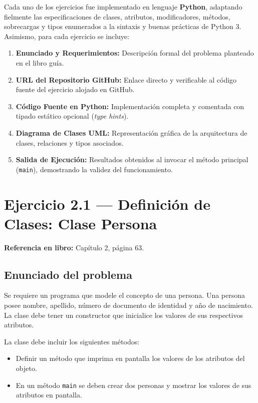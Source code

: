 \documentclass[11pt,a4paper]{article}
\begin{document}
Cada uno de los ejercicios fue implementado en lenguaje \textbf{Python}, adaptando fielmente las especificaciones de clases, atributos, modificadores, métodos, sobrecargas y tipos enumerados a la sintaxis y buenas prácticas de Python 3. Asimismo, para cada ejercicio se incluye:
\begin{enumerate}[leftmargin=*]
    \item \textbf{Enunciado y Requerimientos:} Descripción formal del problema planteado en el libro guía.
    \item \textbf{URL del Repositorio GitHub:} Enlace directo y verificable al código fuente del ejercicio alojado en GitHub.
    \item \textbf{Código Fuente en Python:} Implementación completa y comentada con tipado estático opcional (\textit{type hints}).
    \item \textbf{Diagrama de Clases UML:} Representación gráfica de la arquitectura de clases, relaciones y tipos asociados.
    \item \textbf{Salida de Ejecución:} Resultados obtenidos al invocar el método principal (\texttt{main}), demostrando la validez del funcionamiento.
\end{enumerate}

\newpage

\section{Ejercicio 2.1 — Definición de Clases: Clase Persona}
\textbf{Referencia en libro:} Capítulo 2, página 63.

\subsection{Enunciado del problema}
Se requiere un programa que modele el concepto de una persona. Una persona posee nombre, apellido, número de documento de identidad y año de nacimiento. La clase debe tener un constructor que inicialice los valores de sus respectivos atributos.

La clase debe incluir los siguientes métodos:
\begin{itemize}
    \item Definir un método que imprima en pantalla los valores de los atributos del objeto.
    \item En un método \texttt{main} se deben crear dos personas y mostrar los valores de sus atributos en pantalla.
\end{itemize}
\end{document}

